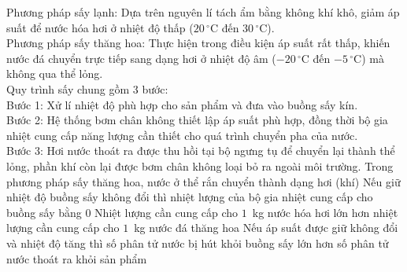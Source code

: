 \begin{ex}
\begin{center}
		\end{center}
		Phương pháp sấy lạnh: Dựa trên nguyên lí tách ẩm bằng không khí khô, giảm áp suất để nước hóa hơi ở nhiệt độ thấp ($20\,^\circ\text{C}$ đến $30\,^\circ\text{C}$).\\
		Phương pháp sấy thăng hoa: Thực hiện trong điều kiện áp suất rất thấp, khiến nước đá chuyển trực tiếp sang dạng hơi ở nhiệt độ âm ($-20\,^\circ\text{C}$ đến $-5\,^\circ\text{C}$) mà không qua thể lỏng.\\
		Quy trình sấy chung gồm 3 bước:\\
		Bước 1: Xử lí nhiệt độ phù hợp cho sản phẩm và đưa vào buồng sấy kín.\\
		Bước 2: Hệ thống bơm chân không thiết lập áp suất phù hợp, đồng thời bộ gia nhiệt cung cấp năng lượng cần thiết cho quá trình chuyển pha của nước.\\
		Bước 3: Hơi nước thoát ra được thu hồi tại bộ ngưng tụ để chuyển lại thành thể lỏng, phần khí còn lại được bơm chân không loại bỏ ra ngoài môi trường.
		\choiceTFt
		{\True Trong phương pháp sấy thăng hoa, nước ở thể rắn chuyển thành dạng hơi (khí)}
		{Nếu giữ nhiệt độ buồng sấy không đổi thì nhiệt lượng của bộ gia nhiệt cung cấp cho buồng sấy bằng $0$}
		{Nhiệt lượng cần cung cấp cho $1$~kg nước hóa hơi lớn hơn nhiệt lượng cần cung cấp cho $1$~kg nước đá thăng hoa}
		{\True Nếu áp suất được giữ không đổi và nhiệt độ tăng thì số phân tử nước bị hút khỏi buồng sấy lớn hơn số phân tử nước thoát ra khỏi sản phẩm}
	\end{ex}

